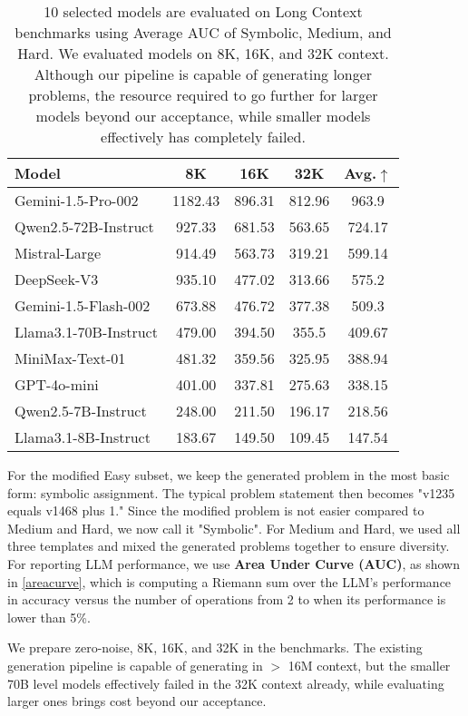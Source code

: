 \begin{wraptable}{r}{0.5\textwidth} 
\centering 
\caption{10 selected models are evaluated on \sysb Long Context benchmarks using Average AUC of Symbolic, Medium, and Hard. We evaluated models on 8K, 16K, and 32K context. Although our pipeline is capable of generating longer problems, the resource required to go further for larger models beyond our acceptance, while smaller models effectively has completely failed.} 
\footnotesize 
\begin{tabular}{@{}lcccc@{}}
\toprule
\textbf{Model} & \textbf{8K} & \textbf{16K} & \textbf{32K} & \textbf{Avg.$\uparrow$} \\
\midrule
Gemini-1.5-Pro-002 & 1182.43 & 896.31 & 812.96 & 963.9 \\
Qwen2.5-72B-Instruct & 927.33 & 681.53 & 563.65 & 724.17 \\
Mistral-Large & 914.49 & 563.73 & 319.21 & 599.14 \\
DeepSeek-V3 & 935.10 & 477.02 & 313.66 & 575.2 \\
Gemini-1.5-Flash-002 & 673.88  & 476.72 & 377.38 & 509.3 \\
Llama3.1-70B-Instruct & 479.00 & 394.50 & 355.5 & 409.67 \\
MiniMax-Text-01 & 481.32  & 359.56 & 325.95 & 388.94 \\
GPT-4o-mini & 401.00  & 337.81 & 275.63 & 338.15 \\
Qwen2.5-7B-Instruct & 248.00  & 211.50 & 196.17 & 218.56 \\
Llama3.1-8B-Instruct & 183.67  & 149.50 & 109.45 & 147.54 \\

\bottomrule
\end{tabular} 
\label{longcontextleaderb} 
\vspace{-5mm} 
\end{wraptable} 

For the modified Easy subset, we keep the generated problem in the most basic form: symbolic assignment. The typical problem statement then becomes "v1235 equals v1468 plus 1." Since the modified problem is not easier compared to Medium and Hard, we now call it "Symbolic". For Medium and Hard, we used all three templates and mixed the generated problems together to ensure diversity. For reporting LLM performance, we use \textbf{Area Under Curve (AUC)}, as shown in \cref{areacurve}, which is computing a Riemann sum over the LLM's performance in accuracy versus the number of operations from 2 to when its performance is lower than 5\%. 

We prepare zero-noise, 8K, 16K, and 32K in the benchmarks. The existing generation pipeline is capable of generating in $>$ 16M context, but the smaller 70B level models effectively failed in the 32K context already, while evaluating larger ones brings cost beyond our acceptance.
